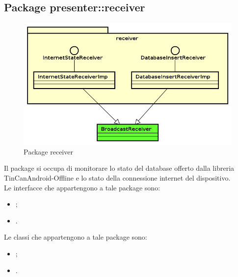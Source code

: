 \documentclass[../Tesi.tex]{subfiles}
\begin{document}
	\subsection{Package presenter::receiver}
		\begin{figure}[H]
			\centering
			\includegraphics[scale=0.6]{images/package_diagrams/receiver}
				\caption{Package receiver}
		\end{figure}
		Il package  si occupa di monitorare lo stato del database offerto dalla libreria TinCanAndroid-Offline e lo stato della connessione internet del dispositivo. \\
		Le interfacce che appartengono a tale package sono:
		\begin{itemize}
			\item {};
			\item {}.
		\end{itemize}
		Le classi che appartengono a tale package sono:
		\begin{itemize}
			\item {};
			\item {}.
		\end{itemize}
\end{document}
